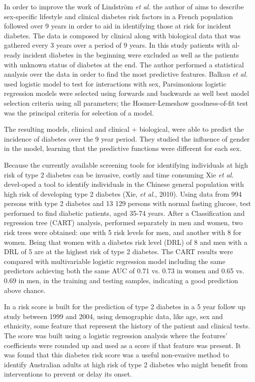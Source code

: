 In order to improve the work of Lindström \emph{et al.} the author of \cite{Balkau2008} aims to describe sex-specific lifestyle and clinical
 diabetes risk factors in a French population followed over 9 years in order to aid in identifying those at risk for incident diabetes.
 The data is composed by clinical along with biological data that was gathered every 3 years over a period of 9 years. In this study 
 patients with al-ready incident diabetes in the beginning were excluded as well as the patients with unknown status of diabetes at 
 the end. The author performed a statistical analysis over the data in order to find the most predictive features. Balkau \emph{et al.} used 
 logistic model to test for interactions with sex, Parsimonious logistic regression models were selected using forwards and backwards
 as well best model selection criteria using all parameters; the Hosmer-Lemeshow goodness-of-fit test was the principal criteria for
 selection of a model. 

The resulting models, clinical and clinical + biological, were able to predict the incidence of diabetes over the 9 year period.
  They studied the influence of gender in the model, learning that the predictive functions were different for each sex. 

Because the currently available screening tools for identifying individuals at high risk of type 2 diabetes can be invasive,
 costly and time consuming Xie \emph{et al.} devel-oped a tool to identify individuals in the Chinese general population with high risk
 of developing type 2 diabetes (Xie, \emph{et al.}, 2010). Using data from 994 persons with type 2 diabetes and 13 129 persons with normal
 fasting glucose, test performed to find diabetic patients, aged 35-74 years. After a Classification and regression tree (CART)
 analysis, performed separately in men and women, two risk trees were obtained: one with 5 risk levels for men, and another with 
 8 for women. Being that women with a diabetes risk level (DRL) of 8 and men with a DRL of 5 are at the highest risk of type 2 
 diabetes. The CART results were compared with multivariable logistic regression model including the same predictors achieving 
 both the same AUC of 0.71 vs. 0.73 in women and 0.65 vs. 0.69 in men, in the training and testing samples, indicating a good 
 prediction above chance.

In \cite{Chen2010} a risk score is built for the prediction of type 2 diabetes in a 5 year follow up study between 1999 and
 2004, using demographic data, like age, sex and ethnicity, some feature that represent the history of the patient and clinical
 tests. The score was built using a logistic regression analysis where the features’ coefficients were rounded up and used as
 a score if that feature was present. It was found that this diabetes risk score was a useful non-evasive method to identify
 Australian adults at high risk of type 2 diabetes who might benefit from interventions to prevent or delay its onset.


